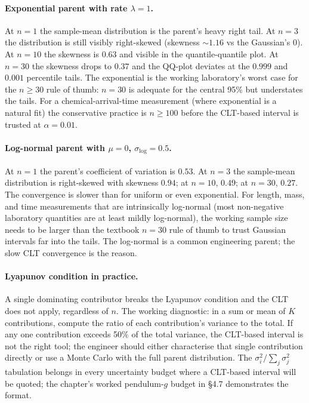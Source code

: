 \paragraph{Exponential parent with rate $\lambda = 1$.} At
$n = 1$ the sample-mean distribution is the parent's heavy
right tail. At $n = 3$ the distribution is still visibly
right-skewed (skewness $\sim 1.16$ vs the Gaussian's $0$).
At $n = 10$ the skewness is $0.63$ and visible in the
quantile-quantile plot. At $n = 30$ the skewness drops to
$0.37$ and the QQ-plot deviates at the $0.999$ and
$0.001$ percentile tails. The exponential is the working
laboratory's worst case for the $n \geq 30$ rule of thumb:
$n = 30$ is adequate for the central 95\% but understates
the tails. For a chemical-arrival-time measurement (where
exponential is a natural fit) the conservative practice is
$n \geq 100$ before the CLT-based interval is trusted at
$\alpha = 0.01$.

\paragraph{Log-normal parent with $\mu = 0$, $\sigma_{\log}
= 0.5$.} At $n = 1$ the parent's coefficient of variation
is $0.53$. At $n = 3$ the sample-mean distribution is
right-skewed with skewness $0.94$; at $n = 10$, $0.49$; at
$n = 30$, $0.27$. The convergence is slower than for uniform
or even exponential. For length, mass, and time measurements
that are intrinsically log-normal (most non-negative
laboratory quantities are at least mildly log-normal), the
working sample size needs to be larger than the textbook
$n = 30$ rule of thumb to trust Gaussian intervals far into
the tails. The log-normal is a common engineering parent;
the slow CLT convergence is the reason.

\paragraph{Lyapunov condition in practice.} A single
dominating contributor breaks the Lyapunov condition and the
CLT does not apply, regardless of $n$. The working diagnostic:
in a sum or mean of $K$ contributions, compute the ratio of
each contribution's variance to the total. If any one
contribution exceeds 50\% of the total variance, the CLT-based
interval is not the right tool; the engineer should either
characterise that single contribution directly or use a Monte
Carlo with the full parent distribution. The
$\sigma_{i}^{2}/\sum_{j} \sigma_{j}^{2}$ tabulation belongs in
every uncertainty budget where a CLT-based interval will be
quoted; the chapter's worked pendulum-$g$ budget in §4.7
demonstrates the format.

